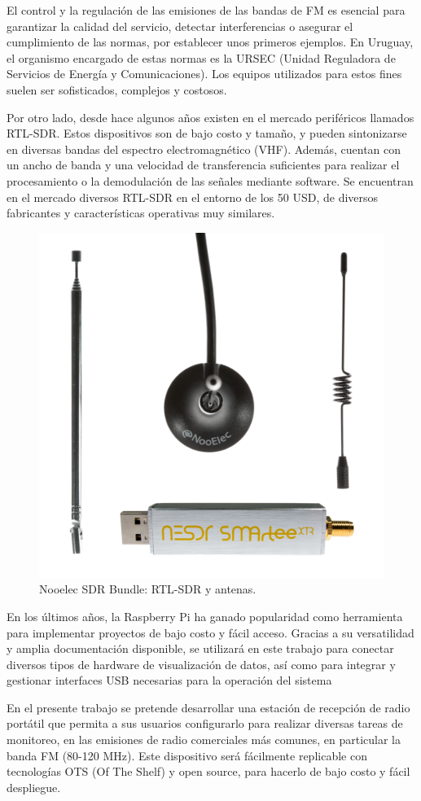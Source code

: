 \documentclass[
11pt, %
codirector, %
]{charter}
\begin{document}
El control y la regulación de las emisiones de las bandas de FM es esencial para garantizar la calidad del servicio, detectar interferencias o asegurar el cumplimiento de las normas, por establecer unos primeros ejemplos. En Uruguay, el organismo encargado de estas normas es la URSEC (Unidad Reguladora de Servicios de Energía y Comunicaciones). Los equipos utilizados para estos fines suelen ser sofisticados, complejos y costosos. 

Por otro lado, desde hace algunos años existen en el mercado periféricos llamados RTL-SDR. Estos dispositivos son de bajo costo y tamaño, y pueden sintonizarse en diversas bandas del espectro electromagnético (VHF). Además, cuentan con un ancho de banda y una velocidad de transferencia suficientes para realizar el procesamiento o la demodulación de las señales mediante software. Se encuentran en el mercado diversos RTL-SDR en el entorno de los 50 USD, de diversos fabricantes y características operativas muy similares.

\begin{figure}[H]
\centering 
\includegraphics[width=.65\textwidth]{./Figuras/RTL-SDR.png} 
\caption{Nooelec SDR Bundle: RTL-SDR y antenas.}
\label{fig:diagBloques}
\end{figure}

En los últimos años, la Raspberry Pi ha ganado popularidad como herramienta para implementar proyectos de bajo costo y fácil acceso. Gracias a su versatilidad y amplia documentación disponible, se utilizará en este trabajo para conectar diversos tipos de hardware de visualización de datos, así como para integrar y gestionar interfaces USB necesarias para la operación del sistema

En el presente trabajo se pretende desarrollar una estación de recepción de radio portátil que permita a sus usuarios configurarlo para realizar diversas tareas de monitoreo, en las emisiones de radio comerciales más comunes, en particular la banda FM (80-120 MHz). Este dispositivo será fácilmente replicable con tecnologías OTS (Of The Shelf) y open source, para hacerlo de bajo costo y fácil despliegue. 
\end{document}
